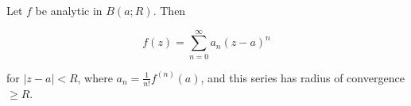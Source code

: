 Let $f$ be analytic in $B(a; R)$. Then

$$f(z) = \sum_{n=0}^{\infty} a_n (z - a)^n$$

for $|z - a| < R$, where $a_n = \frac{1}{n!} f^{(n)}(a)$, and this series has radius of convergence $\geq R$.
